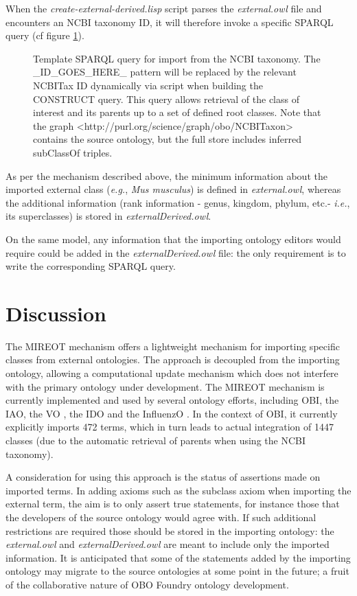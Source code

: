 \documentclass{ao2e}%
\begin{document}
When the \emph{create-external-derived.lisp} script parses the \emph{external.owl} file and encounters an NCBI taxonomy ID, it will therefore invoke a specific SPARQL query (cf figure \ref{fig:sparql2}). 

\begin{figure}[t]
\scriptsize
 
\caption{Template SPARQL query for import from the NCBI taxonomy. The \_ID\_GOES\_HERE\_ pattern will be replaced by the relevant NCBITax ID dynamically via script when building the CONSTRUCT query. This query allows retrieval of the class of interest and its parents up to a set of defined root classes. Note that the graph <http://purl.org/science/graph/obo/NCBITaxon> contains the source ontology, but the full store includes inferred subClassOf triples.}
\label{fig:sparql2}
\end{figure}
As per the mechanism described above, the minimum information about the imported external class (\emph{e.g.}, \emph{Mus musculus}) is defined in \emph{external.owl}, whereas the additional information (rank information - genus, kingdom, phylum, etc.- \emph{i.e.}, its  superclasses) is stored in \emph{ externalDerived.owl}.

On the same model, any information that the importing ontology editors would require could be added in the \emph{externalDerived.owl} file: the only requirement is to write the corresponding SPARQL query.


\section*{Discussion}

The MIREOT mechanism offers a lightweight mechanism for importing specific classes from external ontologies. The approach is decoupled from the importing ontology, allowing a computational update mechanism which does not interfere with the primary ontology under development. The \ac{MIREOT} mechanism is currently implemented and used by several ontology efforts, including \ac{OBI}, the \ac{IAO}, the \ac{VO} \cite{VO}, the \ac{IDO}\cite{IDO} and the \ac{InfluenzO} \cite{InfluenzO}.
In the context of \ac{OBI}, it currently explicitly imports 472 terms, which in turn leads to actual integration of 1447 classes (due to the automatic retrieval of parents when using the NCBI taxonomy). 

A consideration for using this approach is the status of assertions made on imported terms.
In adding axioms such as the subclass axiom when importing the external term, the aim is to only assert true statements, for instance those that the developers of the source ontology would agree with.
If such additional restrictions are required those should be stored in the importing ontology: the \emph{external.owl} and \emph{externalDerived.owl} are meant to include only the imported information.
It is anticipated that some of the statements added by the importing ontology may migrate to the source ontologies at some point in the future; a fruit of the collaborative nature of OBO Foundry ontology development. 
\end{document}
